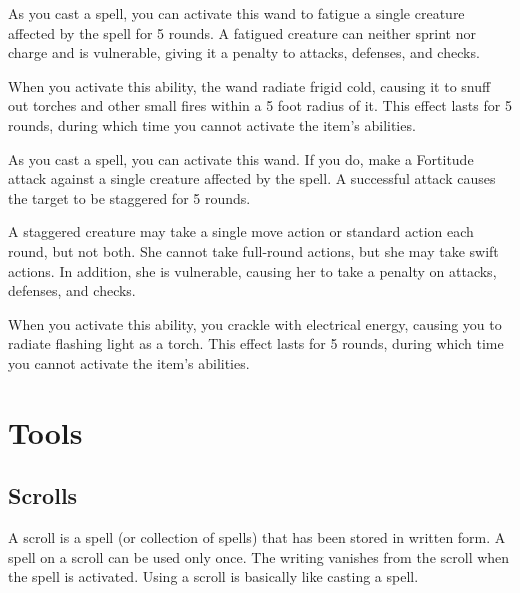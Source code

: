 
             As you cast a spell, you can activate this wand to fatigue a single creature affected by the spell for 5 rounds.
            A fatigued creature can neither sprint nor charge and is vulnerable, giving it a  penalty to attacks, defenses, and checks.

            When you activate this ability, the wand radiate frigid cold, causing it to snuff out torches and other small fires within a 5 foot radius of it.
            This effect lasts for 5 rounds, during which time you cannot activate the item's abilities.


             As you cast a spell, you can activate this wand.
            If you do, make a Fortitude attack against a single creature affected by the spell.
            A successful attack causes the target to be staggered for 5 rounds.

            A staggered creature may take a single move action or standard action each round, but not both.
            She cannot take full-round actions, but she may take swift actions.
            In addition, she is vulnerable, causing her to take a  penalty on attacks, defenses, and checks.

            When you activate this ability, you crackle with electrical energy, causing you to radiate flashing light as a torch.
            This effect lasts for 5 rounds, during which time you cannot activate the item's abilities.


    \section{Tools}

        \subsection{Scrolls}
            A scroll is a spell (or collection of spells) that has been stored in written form.
            A spell on a scroll can be used only once.
            The writing vanishes from the scroll when the spell is activated.
            Using a scroll is basically like casting a spell.

